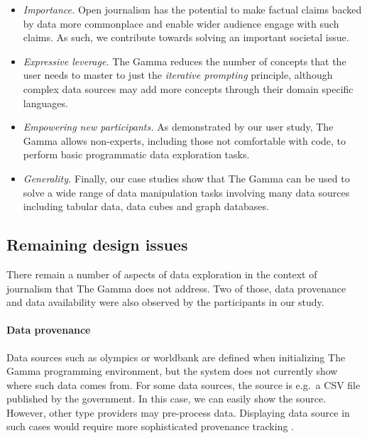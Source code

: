 \documentclass[manuscript,review,anonymous]{acmart}
\newcommand{\ikvd}[1]{{\fontfamily{zi4}\selectfont\small #1}}
\begin{document}
\begin{itemize}
\item \emph{Importance.} Open journalism has the potential to make factual claims backed by
data more commonplace and enable wider audience engage with such claims. As such, we contribute
towards solving an important societal issue.

\item \emph{Expressive leverage.} The Gamma reduces the number of concepts that the user needs
to master to just the \emph{iterative prompting} principle, although complex data sources may
add more concepts through their domain specific languages.

\item \emph{Empowering new participants.} As demonstrated by our user study, The Gamma allows
non-experts, including those not comfortable with code, to perform basic programmatic
data exploration tasks.

\item \emph{Generality.} Finally, our case studies show that The Gamma can be used to solve
a wide range of data manipulation tasks involving many data sources including tabular data,
data cubes and graph databases.
\end{itemize}

\subsection{Remaining design issues}
There remain a number of aspects of data exploration in the context of journalism that
The Gamma does not address. Two of those, data provenance and data availability were also
observed by the participants in our study.

\paragraph{Data provenance}
Data sources such as \ikvd{olympics} or \ikvd{worldbank} are defined when initializing The Gamma
programming environment, but the system does not currently show where such data comes from.
For some data sources, the source is e.g.~a CSV file published by the government. In this case,
we can easily show the source. However, other type providers may pre-process data. Displaying
data source in such cases would require more sophisticated provenance tracking \cite{provenance}.
\end{document}
